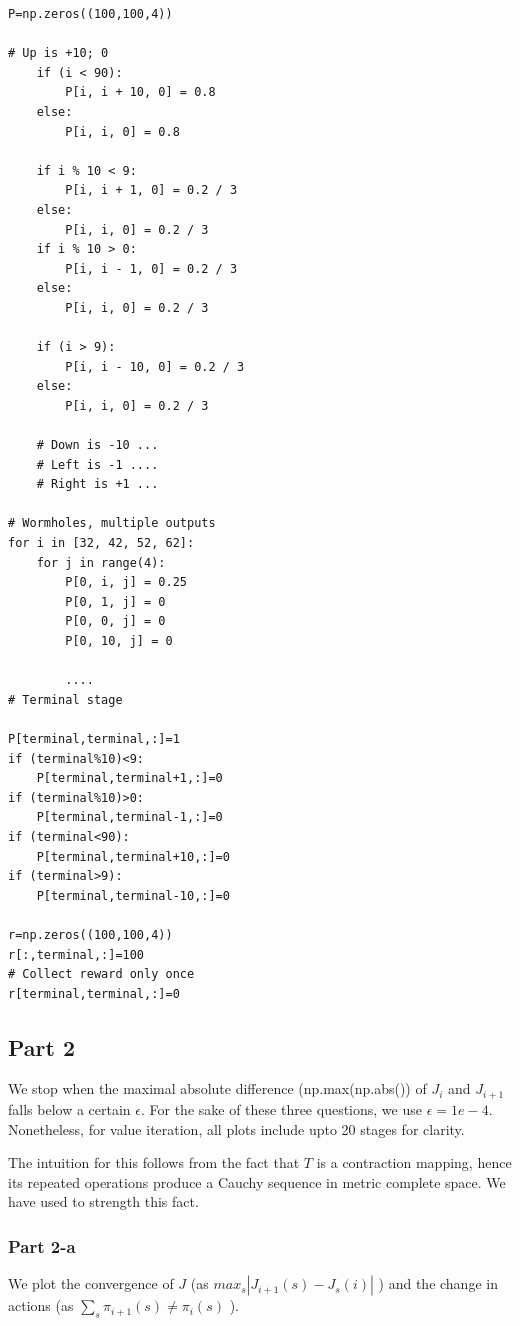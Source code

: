 \begin{lstlisting}
P=np.zeros((100,100,4))

# Up is +10; 0
    if (i < 90):
        P[i, i + 10, 0] = 0.8
    else:
        P[i, i, 0] = 0.8

    if i % 10 < 9:
        P[i, i + 1, 0] = 0.2 / 3
    else:
        P[i, i, 0] = 0.2 / 3
    if i % 10 > 0:
        P[i, i - 1, 0] = 0.2 / 3
    else:
        P[i, i, 0] = 0.2 / 3

    if (i > 9):
        P[i, i - 10, 0] = 0.2 / 3
    else:
        P[i, i, 0] = 0.2 / 3
        
    # Down is -10 ...
    # Left is -1 ....
    # Right is +1 ...
    
# Wormholes, multiple outputs
for i in [32, 42, 52, 62]:
    for j in range(4):
        P[0, i, j] = 0.25
        P[0, 1, j] = 0
        P[0, 0, j] = 0
        P[0, 10, j] = 0
        
        ....
# Terminal stage

P[terminal,terminal,:]=1
if (terminal%10)<9:
    P[terminal,terminal+1,:]=0
if (terminal%10)>0:
    P[terminal,terminal-1,:]=0
if (terminal<90):
    P[terminal,terminal+10,:]=0
if (terminal>9):
    P[terminal,terminal-10,:]=0

r=np.zeros((100,100,4))
r[:,terminal,:]=100
# Collect reward only once
r[terminal,terminal,:]=0
\end{lstlisting}

\subsection{Part 2}

We stop when the maximal absolute difference (np.max(np.abs()) of $J_i$ and $J_{i+1}$ falls below a certain $\epsilon$. For the sake of these three questions, we use $\epsilon = 1e-4$. \\

Nonetheless, for value iteration, all plots include upto 20 stages for clarity.

The intuition for this follows from the fact that $T$ is a contraction mapping, hence its repeated operations produce a Cauchy sequence in metric complete space. We have used to strength this fact.

\subsubsection{Part 2-a}

We plot the convergence of $J$ (as $max_s | J_{i+1}(s) - J_s(i) | $ ) and the change in actions (as $\sum_s \pi_{i+1}(s) \neq \pi_i(s)$ ).


